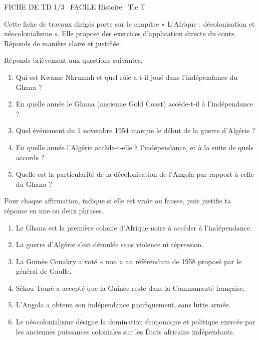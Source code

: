 \documentclass[11pt]{article}
\begin{document}
\begin{tcolorbox}[enhanced,colback=popink,colframe=popink,arc=10pt,boxrule=0pt,left=12pt,right=12pt,top=9pt,bottom=9pt]
{\color{white}\popxbold\small FICHE DE TD 1/3 \textbullet\ FACILE \hfill Histoire \textbullet\ Tle T\par}
\end{tcolorbox}
\vspace{4pt}
Cette fiche de travaux dirigés porte sur le chapitre « L'Afrique : décolonisation et néocolonialisme ». Elle propose des exercices d'application directe du cours. Réponds de manière claire et justifiée.

\begin{exercice}
Réponds brièvement aux questions suivantes.
\begin{enumerate}
\item Qui est Kwame Nkrumah et quel rôle a-t-il joué dans l'indépendance du Ghana ?
\item En quelle année le Ghana (ancienne Gold Coast) accède-t-il à l'indépendance ?
\item Quel événement du 1\ier{} novembre 1954 marque le début de la guerre d'Algérie ?
\item En quelle année l'Algérie accède-t-elle à l'indépendance, et à la suite de quels accords ?
\item Quelle est la particularité de la décolonisation de l'Angola par rapport à celle du Ghana ?
\end{enumerate}
\end{exercice}

\begin{exercice}
Pour chaque affirmation, indique si elle est vraie ou fausse, puis justifie ta réponse en une ou deux phrases.
\begin{enumerate}
\item Le Ghana est la première colonie d'Afrique noire à accéder à l'indépendance.
\item La guerre d'Algérie s'est déroulée sans violence ni répression.
\item La Guinée Conakry a voté « non » au référendum de 1958 proposé par le général de Gaulle.
\item Sékou Touré a accepté que la Guinée reste dans la Communauté française.
\item L'Angola a obtenu son indépendance pacifiquement, sans lutte armée.
\item Le néocolonialisme désigne la domination économique et politique exercée par les anciennes puissances coloniales sur les États africains indépendants.
\end{enumerate}
\end{exercice}
\end{document}
